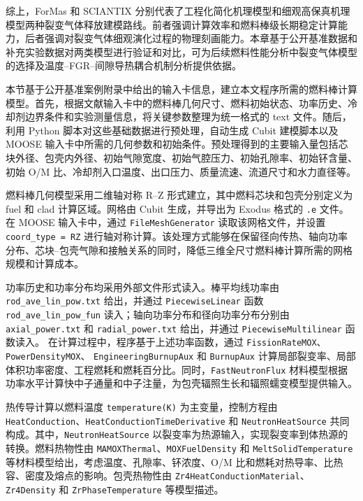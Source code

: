 综上，ForMas 和 SCIANTIX 分别代表了工程化简化机理模型和细观高保真机理模型两种裂变气体释放建模路线。前者强调计算效率和燃料棒级长期稳定计算能力，后者强调对裂变气体细观演化过程的物理刻画能力。本章基于公开基准数据和补充实验数据对两类模型进行验证和对比，可为后续燃料性能分析中裂变气体模型的选择及温度--FGR--间隙导热耦合机制分析提供依据。


本节基于公开基准案例附录中给出的输入卡信息，建立本文程序所需的燃料棒计算模型。首先，根据文献输入卡中的燃料棒几何尺寸、燃料初始状态、功率历史、冷却剂边界条件和实验测量信息，将关键参数整理为统一格式的 text 文件。随后，利用 Python 脚本对这些基础数据进行预处理，自动生成 Cubit 建模脚本以及 MOOSE 输入卡中所需的几何参数和初始条件。预处理得到的主要输入量包括芯块外径、包壳内外径、初始气隙宽度、初始气腔压力、初始孔隙率、初始钚含量、初始 O/M 比、冷却剂入口温度、出口压力、质量流速、流道尺寸和水力直径等。

燃料棒几何模型采用二维轴对称 R--Z 形式建立，其中燃料芯块和包壳分别定义为 fuel 和 clad 计算区域。网格由 Cubit 生成，并导出为 Exodus 格式的 \texttt{.e} 文件。在 MOOSE 输入卡中，通过 \texttt{FileMeshGenerator} 读取该网格文件，并设置 \texttt{coord\_type = RZ} 进行轴对称计算。该处理方式能够在保留径向传热、轴向功率分布、芯块--包壳气隙和接触关系的同时，降低三维全尺寸燃料棒计算所需的网格规模和计算成本。

功率历史和功率分布均采用外部文件形式读入。棒平均线功率由
\texttt{rod\_\allowbreak ave\_\allowbreak lin\_\allowbreak pow.\allowbreak txt}
给出，并通过 \texttt{PiecewiseLinear} 函数
\texttt{rod\_\allowbreak ave\_\allowbreak lin\_\allowbreak pow\_\allowbreak fun}
读入；轴向功率分布和径向功率分布分别由
\texttt{axial\_\allowbreak power.\allowbreak txt}
和
\texttt{radial\_\allowbreak power.\allowbreak txt}
给出，并通过 \texttt{PiecewiseMultilinear} 函数读入。
在计算过程中，程序基于上述功率函数，通过
\texttt{Fission\allowbreak RateMOX}、\texttt{PowerDensityMOX}、
\texttt{EngineeringBurnupAux} 和 \texttt{BurnupAux}
计算局部裂变率、局部体积功率密度、工程燃耗和燃耗百分比。同时，\texttt{FastNeutronFlux} 材料模型根据功率水平计算快中子通量和中子注量，为包壳辐照生长和辐照蠕变模型提供输入。

热传导计算以燃料温度 \texttt{temperature(K)} 为主变量，控制方程由 \texttt{HeatConduction}、\texttt{HeatConductionTimeDerivative} 和 \texttt{NeutronHeatSource} 共同构成。其中，\texttt{NeutronHeat\allowbreak Source} 以裂变率为热源输入，实现裂变率到体热源的转换。燃料热物性由 \texttt{MAMOXThermal}、\texttt{MOXFuelDensity} 和 \texttt{MeltSolidTemperature} 等材料模型给出，考虑温度、孔隙率、钚浓度、O/M 比和燃耗对热导率、比热容、密度及熔点的影响。包壳热物性由 \texttt{Zr4Heat\allowbreak ConductionMaterial}、\texttt{Zr4Density} 和 \texttt{ZrPhaseTemperature} 等模型描述。

